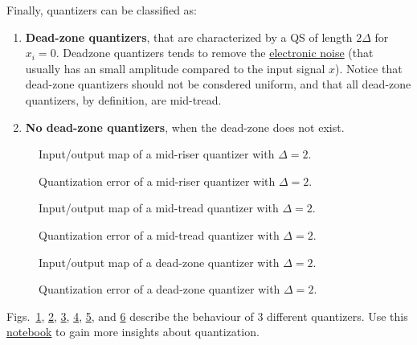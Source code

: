 Finally, quantizers can be classified as:
\begin{enumerate}
\item \textbf{Dead-zone quantizers}, that are characterized by a QS of
  length $2\Delta$ for $x_i=0$. Deadzone quantizers tends to remove
  the
  \href{https://en.wikipedia.org/wiki/Noise_(electronics)}{electronic
    noise} (that usually has an small amplitude compared to the input
  signal $x$). Notice that dead-zone quantizers should not be
  consdered uniform, and that all dead-zone quantizers, by definition,
  are mid-tread.
\item \textbf{No dead-zone quantizers}, when the dead-zone does not
  exist.
\end{enumerate}

\begin{figure}
  \centering
  \caption{Input/output map of a mid-riser quantizer with $\Delta=2$.}
  \label{fig:iomap_mr}
\end{figure}

\begin{figure}
  \centering
  \caption{Quantization error of a mid-riser quantizer with $\Delta=2$.}
  \label{fig:qe_mr}
\end{figure}

\begin{figure}
  \centering
  \caption{Input/output map of a mid-tread quantizer with $\Delta=2$.}
  \label{fig:iomap_mt}
\end{figure}

\begin{figure}
  \centering
  \caption{Quantization error of a mid-tread quantizer with $\Delta=2$.}
  \label{fig:qe_mt}
\end{figure}

\begin{figure}
  \centering
  \caption{Input/output map of a dead-zone quantizer with $\Delta=2$.}
  \label{fig:iomap_dz}
\end{figure}

\begin{figure}
  \centering
  \caption{Quantization error of a dead-zone quantizer with $\Delta=2$.}
  \label{fig:qe_dz}
\end{figure}

Figs.~\ref{fig:iomap_mr}, \ref{fig:qe_mr}, \ref{fig:iomap_mt},
\ref{fig:qe_mt}, \ref{fig:iomap_dz}, and \ref{fig:qe_dz} describe the
behaviour of 3 different quantizers.  Use this
\href{https://github.com/Sistemas-Multimedia/Sistemas-Multimedia.github.io/blob/master/milestones/05-quantization/digital_quantization.ipynb}{notebook}
to gain more insights about quantization.

